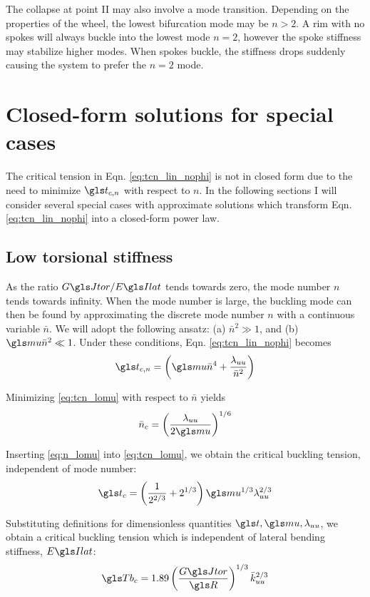 \documentclass[\rootdir/thesis.tex]{subfiles}
\begin{document}
The collapse at point II may also involve a mode transition. Depending on the properties of the wheel, the lowest bifurcation mode may be $n>2$. A rim with no spokes will always buckle into the lowest mode $n=2$, however the spoke stiffness may stabilize higher modes. When spokes buckle, the stiffness drops suddenly causing the system to prefer the $n=2$ mode.


\section{Closed-form solutions for special cases}

The critical tension in Eqn. \eqref{eq:tcn_lin_nophi} is not in closed form due to the need to minimize $\ts_{c,n}$ with respect to $n$. In the following sections I will consider several special cases with approximate solutions which transform Eqn. \eqref{eq:tcn_lin_nophi} into a closed-form power law.

\subsection{Low torsional stiffness}
As the ratio $\GJ/\EIl$ tends towards zero, the mode number $n$ tends towards infinity. When the mode number is large, the buckling mode can then be found by approximating the discrete mode number $n$ with a continuous variable $\bar{n}$. We will adopt the following ansatz: (a) $\bar{n}^2 \gg 1$, and (b) $\m\bar{n}^2 \ll 1$. Under these conditions, Eqn. \eqref{eq:tcn_lin_nophi} becomes
\begin{equation}
\label{eq:tcn_lomu}
\ts_{c,n} = \left(\m \bar{n}^4 + \frac{\lr_{uu}}{\bar{n}^2}\right)
\end{equation}

Minimizing \eqref{eq:tcn_lomu} with respect to $\bar{n}$ yields
\begin{equation}
\label{eq:n_lomu}
\bar{n}_c=\left(\frac{\lr_{uu}}{2\m}\right)^{1/6}
\end{equation}

Inserting \eqref{eq:n_lomu} into \eqref{eq:tcn_lomu}, we obtain the critical buckling tension, independent of mode number:
\begin{equation}
\label{eq:tc_lomu}
\ts_c = \left(\frac{1}{2^{2/3}} + 2^{1/3}\right)\m^{1/3}\lr_{uu}^{2/3}
\end{equation}

Substituting definitions for dimensionless quantities $\ts,\m,\lr_{uu}$, we obtain a critical buckling tension which is independent of lateral bending stiffness, $\EIl$:
\begin{equation}
\label{eq:Tc_lo_mu}
\Tb_c = 1.89 \left( \frac{\GJ}{\R} \right)^{1/3} \kuu^{2/3}
\end{equation}
\end{document}
